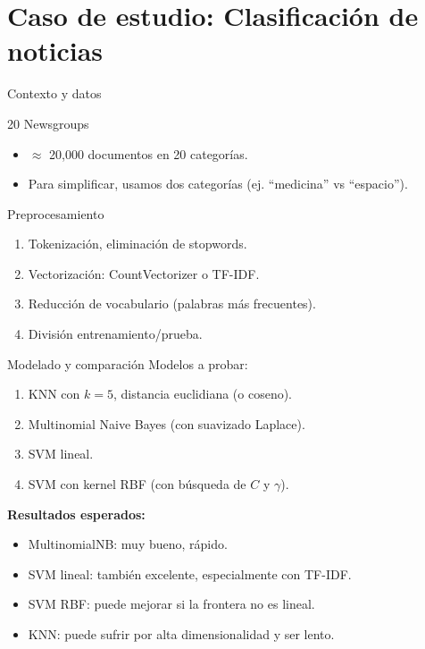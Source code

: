 \documentclass[aspectratio=169, 10pt, xcolor=table]{beamer}
\begin{document}
\section{Caso de estudio: Clasificación de noticias}

\begin{frame}{Contexto y datos}
    \begin{block}{20 Newsgroups}
        \begin{itemize}
            \item $\approx$ 20,000 documentos en 20 categorías.
            \item Para simplificar, usamos dos categorías (ej. ``medicina'' vs ``espacio'').
        \end{itemize}
    \end{block}
    \begin{exampleblock}{Preprocesamiento}
        \begin{enumerate}
            \item Tokenización, eliminación de stopwords.
            \item Vectorización: CountVectorizer o TF-IDF.
            \item Reducción de vocabulario (palabras más frecuentes).
            \item División entrenamiento/prueba.
        \end{enumerate}
    \end{exampleblock}
\end{frame}

\begin{frame}{Modelado y comparación}
    Modelos a probar:
    \begin{enumerate}
        \item KNN con $k=5$, distancia euclidiana (o coseno).
        \item Multinomial Naive Bayes (con suavizado Laplace).
        \item SVM lineal.
        \item SVM con kernel RBF (con búsqueda de $C$ y $\gamma$).
    \end{enumerate}
    \vspace{0.3cm}
    \textbf{Resultados esperados:}
    \begin{itemize}
        \item MultinomialNB: muy bueno, rápido.
        \item SVM lineal: también excelente, especialmente con TF-IDF.
        \item SVM RBF: puede mejorar si la frontera no es lineal.
        \item KNN: puede sufrir por alta dimensionalidad y ser lento.
    \end{itemize}
\end{frame}
\end{document}
